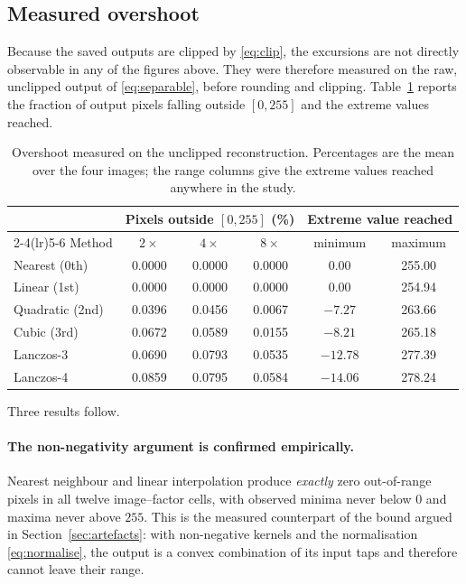\documentclass[11pt,a4paper]{article}
\begin{document}
\subsection{Measured overshoot}
\label{sec:overshoot}

Because the saved outputs are clipped by \eqref{eq:clip}, the excursions are not directly
observable in any of the figures above. They were therefore measured on the raw, unclipped
output of \eqref{eq:separable}, before rounding and clipping. Table~\ref{tab:overshoot}
reports the fraction of output pixels falling outside $[0,255]$ and the extreme values
reached.

\begin{table}[H]
\centering
\caption{Overshoot measured on the unclipped reconstruction. Percentages are the mean over
the four images; the range columns give the extreme values reached anywhere in the study.}
\label{tab:overshoot}
\begin{tabular}{lccc@{\hskip 1.1cm}cc}
\toprule
& \multicolumn{3}{c}{Pixels outside $[0,255]$ (\%)} & \multicolumn{2}{c}{Extreme value reached} \\
\cmidrule(lr){2-4}\cmidrule(lr){5-6}
Method & $2\times$ & $4\times$ & $8\times$ & minimum & maximum \\
\midrule
Nearest (0th)   & 0.0000 & 0.0000 & 0.0000 &   0.00 & 255.00 \\
Linear (1st)    & 0.0000 & 0.0000 & 0.0000 &   0.00 & 254.94 \\
Quadratic (2nd) & 0.0396 & 0.0456 & 0.0067 & $-7.27$ & 263.66 \\
Cubic (3rd)     & 0.0672 & 0.0589 & 0.0155 & $-8.21$ & 265.18 \\
Lanczos-3       & 0.0690 & 0.0793 & 0.0535 & $-12.78$ & 277.39 \\
Lanczos-4       & 0.0859 & 0.0795 & 0.0584 & $-14.06$ & 278.24 \\
\bottomrule
\end{tabular}
\end{table}

Three results follow.

\paragraph{The non-negativity argument is confirmed empirically.} Nearest neighbour and linear
interpolation produce \emph{exactly} zero out-of-range pixels in all twelve image--factor
cells, with observed minima never below $0$ and maxima never above $255$. This is the
measured counterpart of the bound argued in Section~\ref{sec:artefacts}: with non-negative
kernels and the normalisation \eqref{eq:normalise}, the output is a convex combination of its
input taps and therefore cannot leave their range.
\end{document}
